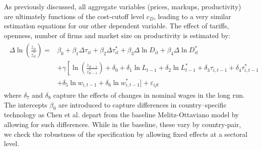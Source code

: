 As previously discussed, all aggregate variables (prices, markups, productivity) are ultimately functions of the cost-cutoff level $c_D$, leading to a very similar estimation equations for our other dependent variable.
The effect of tariffs, openness, number of firms and market size on productivity is estimated by:
\begin{align}
\begin{split}\label{eq:gw-estimation-productivity}
\Delta \ln \left( \frac{\bar{z}_{it}}{\bar{z}_{it}^*} \right) =&\beta_0 + \beta_1 \Delta \tau_{it} + \beta_2 \Delta \tau_{it}^*  + \beta_3 \Delta \ln D_{it} + \beta_4 \Delta \ln D_{it}^*\\
&+ \gamma \left[ \ln \left( \frac{z_{it-1}}{z_{it-1}^*} \right) + \delta_0 + \delta_1 \ln L_{t-1} + \delta_2\ln L_{t-1}^* + \delta_3  \tau_{i,t-1} + \delta_4  \tau_{i,t-1}^*  \right. \\ 
&+ \left. \delta_5 \ln w_{i,t-1} +  \delta_6 \ln w_{i,t-1}^* \bigg] \right. + \varepsilon_{ijt} 
\end{split}
\end{align}
where $\delta_7$ and $\delta_8$ capture the effects of changes in nominal wages in the long run. The intercepts $\beta_0$ are introduced to capture differences in country--specific technology as Chen et al. depart from the baseline Melitz-Ottaviano model by allowing for such differences. While in the baseline, these vary by country-pair, we check the robustness of the specification by allowing fixed effects at a sectoral level. 

